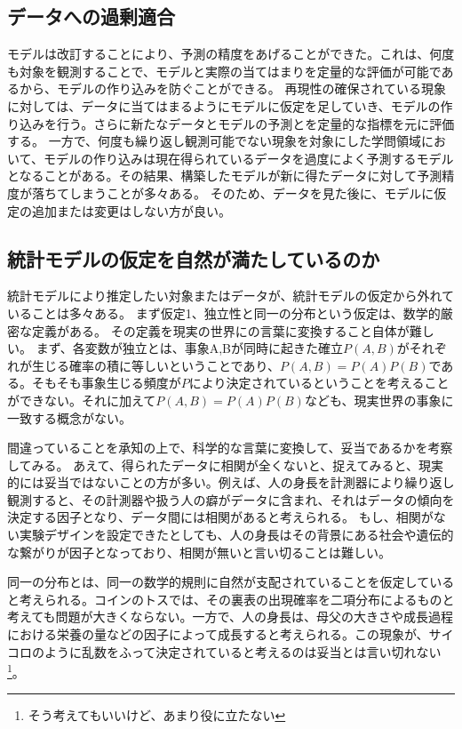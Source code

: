 \subsection{データへの過剰適合}
モデルは改訂することにより、予測の精度をあげることができた。これは、何度も対象を観測することで、モデルと実際の当てはまりを定量的な評価が可能であるから、モデルの作り込みを防ぐことができる。
再現性の確保されている現象に対しては、データに当てはまるようにモデルに仮定を足していき、モデルの作り込みを行う。さらに新たなデータとモデルの予測とを定量的な指標を元に評価する。
一方で、何度も繰り返し観測可能でない現象を対象にした学問領域において、モデルの作り込みは現在得られているデータを過度によく予測するモデルとなることがある。その結果、構築したモデルが新に得たデータに対して予測精度が落ちてしまうことが多々ある。
そのため、データを見た後に、モデルに仮定の追加または変更はしない方が良い。




\subsection{統計モデルの仮定を自然が満たしているのか}
統計モデルにより推定したい対象またはデータが、統計モデルの仮定から外れていることは多々ある。
まず仮定1、独立性と同一の分布という仮定は、数学的厳密な定義がある。
その定義を現実の世界にの言葉に変換すること自体が難しい。
まず、各変数が独立とは、事象A,Bが同時に起きた確立$P(A,B)$がそれぞれが生じる確率の積に等しいということであり、$P(A,B)=P(A)P(B)$である。そもそも事象生じる頻度が$P$により決定されているということを考えることができない。それに加えて$P(A,B)=P(A)P(B)$なども、現実世界の事象に一致する概念がない。

間違っていることを承知の上で、科学的な言葉に変換して、妥当であるかを考察してみる。
あえて、得られたデータに相関が全くないと、捉えてみると、現実的には妥当ではないことの方が多い。例えば、人の身長を計測器により繰り返し観測すると、その計測器や扱う人の癖がデータに含まれ、それはデータの傾向を決定する因子となり、データ間には相関があると考えられる。
もし、相関がない実験デザインを設定できたとしても、人の身長はその背景にある社会や遺伝的な繋がりが因子となっており、相関が無いと言い切ることは難しい。

同一の分布とは、同一の数学的規則に自然が支配されていることを仮定していると考えられる。コインのトスでは、その裏表の出現確率を二項分布によるものと考えても問題が大きくならない。一方で、人の身長は、母父の大きさや成長過程における栄養の量などの因子によって成長すると考えられる。この現象が、サイコロのように乱数をふって決定されていると考えるのは妥当とは言い切れない\footnote{そう考えてもいいけど、あまり役に立たない}。


